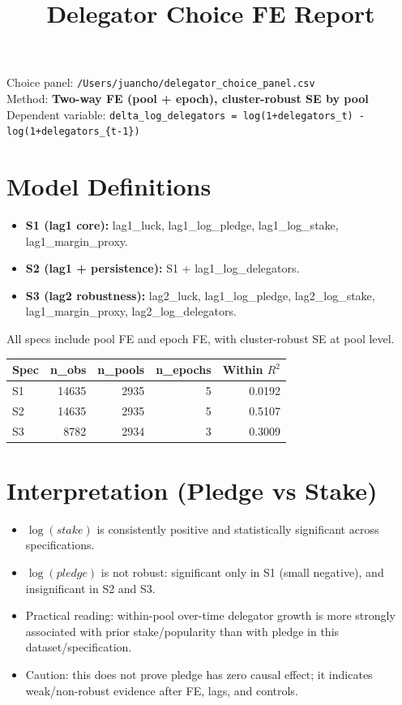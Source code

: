 \documentclass[11pt]{article}
\title{Delegator Choice FE Report}
\author{}
\date{}
\begin{document}
\maketitle
Choice panel: \texttt{/Users/juancho/delegator\_choice\_panel.csv}\\
Method: \textbf{Two-way FE (pool + epoch), cluster-robust SE by pool}\\
Dependent variable: \texttt{delta\_log\_delegators = log(1+delegators\_t) - log(1+delegators\_\{t-1\})}

\section*{Model Definitions}
\begin{itemize}
\item \textbf{S1 (lag1 core):} lag1\_luck, lag1\_log\_pledge, lag1\_log\_stake, lag1\_margin\_proxy.
\item \textbf{S2 (lag1 + persistence):} S1 + lag1\_log\_delegators.
\item \textbf{S3 (lag2 robustness):} lag2\_luck, lag1\_log\_pledge, lag2\_log\_stake, lag1\_margin\_proxy, lag2\_log\_delegators.
\end{itemize}
All specs include pool FE and epoch FE, with cluster-robust SE at pool level.

\begin{table}[h]
\centering
\begin{tabular}{lrrrr}
\toprule
Spec & n\_obs & n\_pools & n\_epochs & Within $R^2$ \\
\midrule
S1 & 14635 & 2935 & 5 & 0.0192 \\
S2 & 14635 & 2935 & 5 & 0.5107 \\
S3 & 8782 & 2934 & 3 & 0.3009 \\
\bottomrule
\end{tabular}
\end{table}

\section*{Interpretation (Pledge vs Stake)}
\begin{itemize}
\item $\log(stake)$ is consistently positive and statistically significant across specifications.
\item $\log(pledge)$ is not robust: significant only in S1 (small negative), and insignificant in S2 and S3.
\item Practical reading: within-pool over-time delegator growth is more strongly associated with prior stake/popularity than with pledge in this dataset/specification.
\item Caution: this does not prove pledge has zero causal effect; it indicates weak/non-robust evidence after FE, lags, and controls.
\end{itemize}
\end{document}
